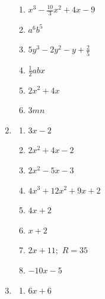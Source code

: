 \begin{description}
\begin{enumerate}[label=\textbf{\thesection.\thetempi.\thetempii}]
\begin{multicols}{3}
\begin{enumerate}[label=\alph*)]
                \item $x^3-\frac{10}{3}x^2+4x-9$
                
                \item $a^6b^5$
                
                \item $5y^3-2y^2-y+\frac{2}{5}$
                
                \item $\frac{1}{2}abx$
                
                \item $2x^2+4x$
                
                \item $3mn$
            \end{enumerate}
        \end{multicols}
        
        \item \begin{multicols}{3}
            \begin{enumerate}[label=\alph*)]
                \item $3x-2$
                
                \item $2x^2+4x-2$
                
                \item $2x^2-5x-3$
                
                \item $4x^3 + 12x^2 + 9x+2$
                
                \item $4x+2$
                
                \item $x+2$
                
                \item $2x+11;$ $R=35$
                
                \item $-10x-5$
            \end{enumerate}
        \end{multicols}
        
        \item \begin{multicols}{5}
            \begin{enumerate}[label=\alph*)]
                \item $6x+6$
                

\end{enumerate}
\end{multicols}
\end{enumerate}
\end{description}
